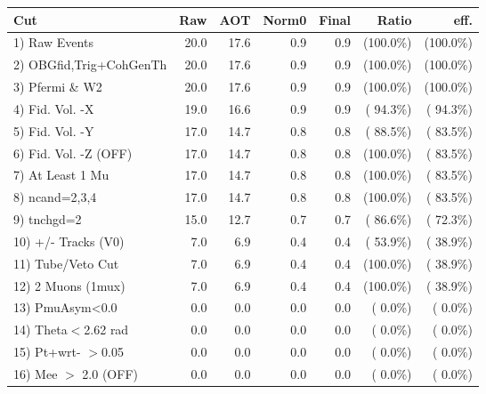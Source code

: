 \begin{table}[h!]\centering
 \begin{tabular}{||l||r|r|r|r|r|r||}
 \hline
 \hline
 Cut & Raw & AOT & Norm0 & Final & Ratio & eff.       \\
 \hline
  1) Raw Events           &         20.0 &         17.6 &          0.9 &          0.9 & (100.0\%) & (100.0\%) \\
  2) OBGfid,Trig+CohGenTh &         20.0 &         17.6 &          0.9 &          0.9 & (100.0\%) & (100.0\%) \\
  3) Pfermi \& W2         &         20.0 &         17.6 &          0.9 &          0.9 & (100.0\%) & (100.0\%) \\
  4) Fid. Vol. -X         &         19.0 &         16.6 &          0.9 &          0.9 & ( 94.3\%) & ( 94.3\%) \\
  5) Fid. Vol. -Y         &         17.0 &         14.7 &          0.8 &          0.8 & ( 88.5\%) & ( 83.5\%) \\
  6) Fid. Vol. -Z (OFF)   &         17.0 &         14.7 &          0.8 &          0.8 & (100.0\%) & ( 83.5\%) \\
  7) At Least 1 Mu        &         17.0 &         14.7 &          0.8 &          0.8 & (100.0\%) & ( 83.5\%) \\
  8) ncand=2,3,4          &         17.0 &         14.7 &          0.8 &          0.8 & (100.0\%) & ( 83.5\%) \\
  9) tnchgd=2             &         15.0 &         12.7 &          0.7 &          0.7 & ( 86.6\%) & ( 72.3\%) \\
 10) +/- Tracks (V0)      &          7.0 &          6.9 &          0.4 &          0.4 & ( 53.9\%) & ( 38.9\%) \\
 11) Tube/Veto Cut        &          7.0 &          6.9 &          0.4 &          0.4 & (100.0\%) & ( 38.9\%) \\
 12) 2 Muons (1mux)       &          7.0 &          6.9 &          0.4 &          0.4 & (100.0\%) & ( 38.9\%) \\
 13) PmuAsym<0.0          &          0.0 &          0.0 &          0.0 &          0.0 & (  0.0\%) & (  0.0\%) \\
 14) Theta$<$2.62 rad     &          0.0 &          0.0 &          0.0 &          0.0 & (  0.0\%) & (  0.0\%) \\
 15) Pt+wrt- $>$0.05      &          0.0 &          0.0 &          0.0 &          0.0 & (  0.0\%) & (  0.0\%) \\
 16) Mee $>$ 2.0  (OFF)   &          0.0 &          0.0 &          0.0 &          0.0 & (  0.0\%) & (  0.0\%) \\

\end{tabular}
\end{table}
